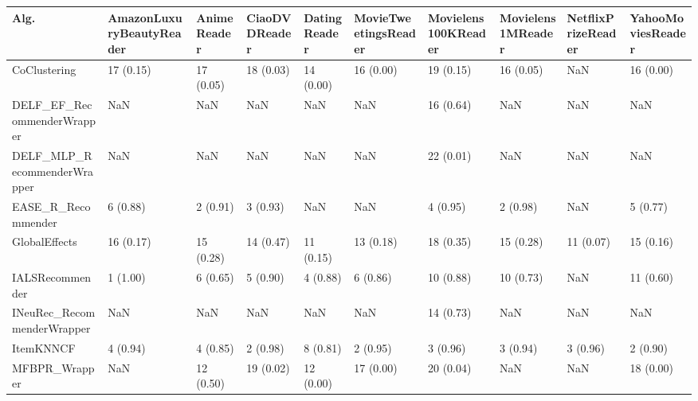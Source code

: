 \begin{tabular}{llllllllll}
\toprule
                               Alg. & AmazonLuxuryBeautyReader & AnimeReader & CiaoDVDReader & DatingReader & MovieTweetingsReader & Movielens100KReader & Movielens1MReader & NetflixPrizeReader & YahooMoviesReader \\
\midrule
                       CoClustering &                17 (0.15) &   17 (0.05) &     18 (0.03) &    14 (0.00) &            16 (0.00) &           19 (0.15) &         16 (0.05) &                NaN &         16 (0.00) \\
         DELF\_EF\_RecommenderWrapper &                      NaN &         NaN &           NaN &          NaN &                  NaN &           16 (0.64) &               NaN &                NaN &               NaN \\
        DELF\_MLP\_RecommenderWrapper &                      NaN &         NaN &           NaN &          NaN &                  NaN &           22 (0.01) &               NaN &                NaN &               NaN \\
                 EASE\_R\_Recommender &                 6 (0.88) &    2 (0.91) &      3 (0.93) &          NaN &                  NaN &            4 (0.95) &          2 (0.98) &                NaN &          5 (0.77) \\
                      GlobalEffects &                16 (0.17) &   15 (0.28) &     14 (0.47) &    11 (0.15) &            13 (0.18) &           18 (0.35) &         15 (0.28) &          11 (0.07) &         15 (0.16) \\
                    IALSRecommender &                 1 (1.00) &    6 (0.65) &      5 (0.90) &     4 (0.88) &             6 (0.86) &           10 (0.88) &         10 (0.73) &                NaN &         11 (0.60) \\
         INeuRec\_RecommenderWrapper &                      NaN &         NaN &           NaN &          NaN &                  NaN &           14 (0.73) &               NaN &                NaN &               NaN \\
                          ItemKNNCF &                 4 (0.94) &    4 (0.85) &      2 (0.98) &     8 (0.81) &             2 (0.95) &            3 (0.96) &          3 (0.94) &           3 (0.96) &          2 (0.90) \\
                      MFBPR\_Wrapper &                      NaN &   12 (0.50) &     19 (0.02) &    12 (0.00) &            17 (0.00) &           20 (0.04) &               NaN &                NaN &         18 (0.00) \\

\end{tabular}
